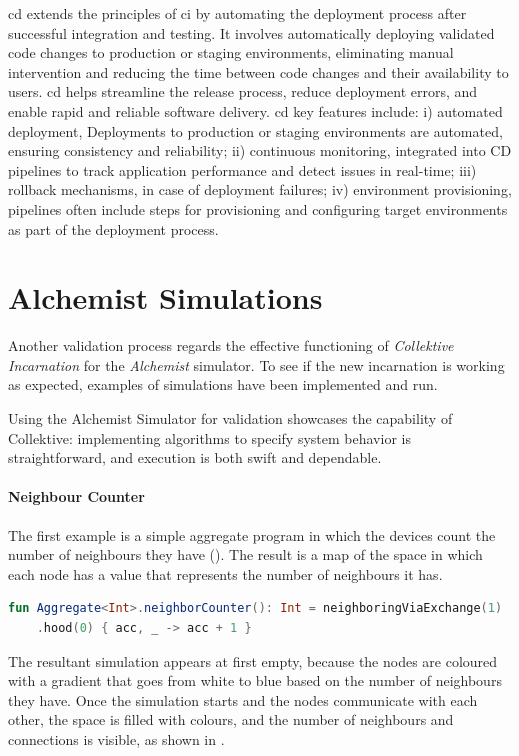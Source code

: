 \ac{cd} extends the principles of \ac{ci} by automating the deployment process after successful integration and testing.
It involves automatically deploying validated code changes to production or staging environments, eliminating manual
intervention and reducing the time between code changes and their availability to users.
\ac{cd} helps streamline the release process, reduce deployment errors, and enable rapid and reliable software delivery.
\ac{cd} key features include:
    i) automated deployment, Deployments to production or staging environments are automated, ensuring consistency and reliability;
    ii) continuous monitoring, integrated into CD pipelines to track application performance and detect issues in real-time;
    iii) rollback mechanisms, in case of deployment failures;
    iv) environment provisioning, pipelines often include steps for provisioning and configuring target environments as part of the deployment process.

\section{Alchemist Simulations}
\label{sec:alchemist-simulations}
Another validation process regards the effective functioning of \emph{Collektive Incarnation} for the \emph{Alchemist} simulator.
To see if the new incarnation is working as expected, examples of simulations have been implemented and run.

Using the Alchemist Simulator for validation showcases the capability of Collektive: implementing algorithms to specify
system behavior is straightforward, and execution is both swift and dependable.

\paragraph{Neighbour Counter}
The first example is a simple aggregate program in which the devices count the number of neighbours they have ().
The result is a map of the space in which each node has a value that represents the number of neighbours it has.

\begin{lstlisting}[language=kt, caption={Neighbour counter code example}, label={lst:neighbour-counter-example}]
fun Aggregate<Int>.neighborCounter(): Int = neighboringViaExchange(1)
    .hood(0) { acc, _ -> acc + 1 }
\end{lstlisting}

The resultant simulation appears at first empty, because the nodes are coloured with a gradient that goes from white to
blue based on the number of neighbours they have.
Once the simulation starts and the nodes communicate with each other, the space is filled with colours, and the number of
neighbours and connections is visible, as shown in .

